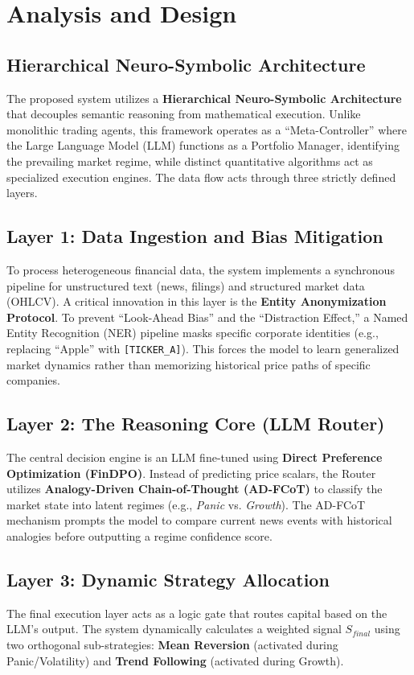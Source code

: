 \documentclass[12pt, a4paper]{report}
\begin{document}
\section{Analysis and Design}

\subsection{Hierarchical Neuro-Symbolic Architecture}
The proposed system utilizes a \textbf{Hierarchical Neuro-Symbolic Architecture} that decouples semantic reasoning from mathematical execution. Unlike monolithic trading agents, this framework operates as a ``Meta-Controller'' where the Large Language Model (LLM) functions as a Portfolio Manager, identifying the prevailing market regime, while distinct quantitative algorithms act as specialized execution engines. The data flow acts through three strictly defined layers.

\subsection{Layer 1: Data Ingestion and Bias Mitigation}
To process heterogeneous financial data, the system implements a synchronous pipeline for unstructured text (news, filings) and structured market data (OHLCV). A critical innovation in this layer is the \textbf{Entity Anonymization Protocol}. To prevent ``Look-Ahead Bias'' and the ``Distraction Effect,'' a Named Entity Recognition (NER) pipeline masks specific corporate identities (e.g., replacing ``Apple'' with \texttt{[TICKER\_A]}). This forces the model to learn generalized market dynamics rather than memorizing historical price paths of specific companies.

\subsection{Layer 2: The Reasoning Core (LLM Router)}
The central decision engine is an LLM fine-tuned using \textbf{Direct Preference Optimization (FinDPO)}. Instead of predicting price scalars, the Router utilizes \textbf{Analogy-Driven Chain-of-Thought (AD-FCoT)} to classify the market state into latent regimes (e.g., \textit{Panic} vs. \textit{Growth}). The AD-FCoT mechanism prompts the model to compare current news events with historical analogies before outputting a regime confidence score.

\subsection{Layer 3: Dynamic Strategy Allocation}
The final execution layer acts as a logic gate that routes capital based on the LLM's output. The system dynamically calculates a weighted signal $S_{final}$ using two orthogonal sub-strategies: \textbf{Mean Reversion} (activated during Panic/Volatility) and \textbf{Trend Following} (activated during Growth).
\end{document}
